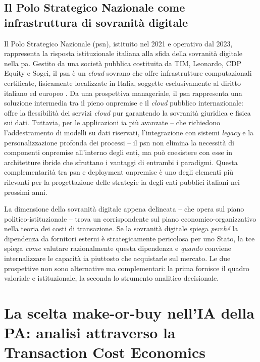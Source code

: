 \subsection{Il Polo Strategico Nazionale come infrastruttura di sovranità digitale}

Il Polo Strategico Nazionale (\gls{psn}), istituito nel 2021 e operativo dal 2023, rappresenta la risposta istituzionale italiana alla sfida della sovranità digitale nella \gls{pa}. Gestito da una società pubblica costituita da TIM, Leonardo, CDP Equity e Sogei, il \gls{psn} è un \textit{cloud} sovrano che offre infrastrutture computazionali certificate, fisicamente localizzate in Italia, soggette esclusivamente al diritto italiano ed europeo \parencite{ACN2022}. Da una prospettiva manageriale, il \gls{psn} rappresenta una soluzione intermedia tra il pieno \gls{onpremise} e il \textit{cloud} pubblico internazionale: offre la flessibilità dei servizi \textit{cloud} pur garantendo la sovranità giuridica e fisica sui dati. Tuttavia, per le applicazioni \gls{ia} più avanzate -- che richiedono l'addestramento di modelli su dati riservati, l'integrazione con sistemi \textit{legacy} e la personalizzazione profonda dei processi -- il \gls{psn} non elimina la necessità di componenti \gls{onpremise} all'interno degli enti, ma può coesistere con esse in architetture ibride che sfruttano i vantaggi di entrambi i paradigmi. Questa complementarità tra \gls{psn} e deployment \gls{onpremise} è uno degli elementi più rilevanti per la progettazione delle strategie \gls{ia} degli enti pubblici italiani nei prossimi anni.

La dimensione della sovranità digitale appena delineata -- che opera sul piano politico-istituzionale -- trova un corrispondente sul piano economico-organizzativo nella teoria dei costi di transazione. Se la sovranità digitale spiega \textit{perché} la dipendenza da fornitori esterni è strategicamente pericolosa per uno Stato, la \gls{tce} spiega \textit{come} valutare razionalmente questa dipendenza e \textit{quando} conviene internalizzare le capacità \gls{ia} piuttosto che acquistarle sul mercato. Le due prospettive non sono alternative ma complementari: la prima fornisce il quadro valoriale e istituzionale, la seconda lo strumento analitico decisionale.

\section{La scelta make-or-buy nell'IA della PA: analisi attraverso la Transaction Cost Economics}
\label{sec:cap2-tce}

